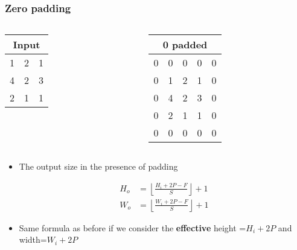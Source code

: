 \documentclass{beamer}
\begin{document}
\begin{frame}
    \frametitle{Zero padding}
\begin{columns}
\begin{column}{0.5\textwidth}
    \begin{tabular}[h]{|c|c|c|}
        \multicolumn{3}{c}{Input}\\
        \hline
         1& 2 &1 \\
         \hline
         4 & 2 & 3 \\
         \hline
         2 & 1 & 1\\
        \hline
    \end{tabular}

    
\end{column}
\begin{column}{0.5\textwidth}
    \begin{tabular}[h]{|c|c|c|c|c|}
        \multicolumn{5}{c}{0 padded}\\
        \hline
        {\color{red}0} & {\color{red}0} & {\color{red}0} & {\color{red}0} &{\color{red}0}\\
        \hline
        {\color{red}0} & 1& 2 &1 & {\color{red}0}\\
         \hline
         {\color{red}0}&  4 & 2 & 3 & {\color{red}0} \\
         \hline
         {\color{red}0}& 2 & 1 & 1 & {\color{red}0}\\
        \hline
        {\color{red}0} & {\color{red}0} & {\color{red}0} & {\color{red}0} & {\color{red}0}\\
        \hline
    \end{tabular}
\end{column}

\end{columns}
    \begin{itemize}
        \item The output size in the presence of padding
   
    \begin{align*}
        H_o&=\left\lfloor\frac{H_i+2P-F}{S}\right\rfloor+1\\
        W_o&=\left\lfloor\frac{W_i+2P-F}{S}\right\rfloor+1
    \end{align*}
    \item  Same formula as before if we consider the \textbf{effective} height =$H_i+2P$ and width=$W_i+2P$ 
\end{itemize}
\end{frame}
\end{document}
